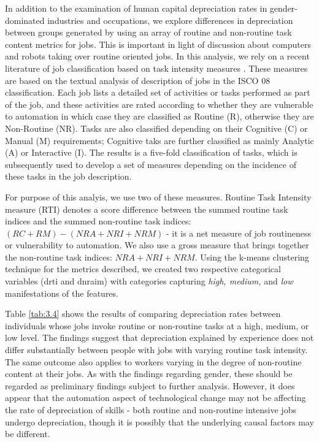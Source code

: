 \documentclass[alpha-refs]{wiley-article-02b}
\begin{document}
In addition to the examination of human capital depreciation rates in gender-dominated industries and occupations, we explore differences in depreciation  between groups generated by using an array of routine and non-routine task content metrics for jobs. This is important in light of discussion about computers and robots taking over routine oriented jobs. In this analysis, we rely on a recent literature of job classification based on task intensity measures  \citet{mihaylov_152._2019}. These measures are based on the textual analysis of description of jobs in the ISCO 08 classification. Each job lists a detailed set of activities or tasks performed as part of the job, and these activities are rated according to whether they are vulnerable to automation in which case they are classified as Routine (R), otherwise they are Non-Routine (NR). Tasks are also classified depending on their Cognitive (C) or Manual (M) requirements; Cognitive taks are further classified as mainly Analytic (A) or Interactive (I). The results is a five-fold classification of tasks, which is subsequently used to develop a set of measures depending on the incidence of these tasks in the job description.

For purpose of this analyis, we use two of these measures. Routine Task Intensity measure (RTI) denotes a score difference between the summed routine task indices and the summed non-routine task indices: $(RC + RM) - (NRA + NRI + NRM)$ - it is a net measure of job routineness or vulnerability to automation. We also use a gross measure that brings together the non-routine task indices: $NRA + NRI + NRM$. Using the k-means clustering technique for the metrics described, we created two respective categorical variables (drti and dnraim) with categories capturing \textit{high, medium,} and \textit{low} manifestations of the features.

Table \ref{tab:3.4} shows the results of comparing depreciation rates between individuals whose jobs invoke routine or non-routine tasks at a high, medium, or low level. The findings suggest that depreciation explained by experience does not differ substantially between people with jobs with varying routine task intensity. The same outcome also applies to workers varying in the degree of non-routine content at their jobs. As with the findings regarding gender, these should be regarded as preliminary findings subject to further analysis. However, it does appear that the automation aspect of technological change may not be affecting the rate of depreciation of skills - both routine and non-routine intensive jobs undergo depreciation, though it is possibly that the underlying causal factors may be different. 
\end{document}
